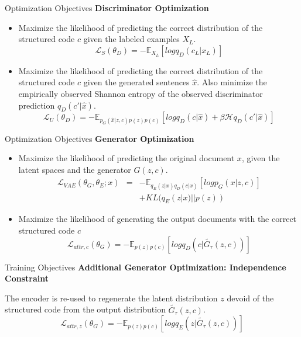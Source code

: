 \documentclass{beamer}
\begin{document}
  \begin{frame}{Optimization Objectives}
    \textbf{Discriminator Optimization} 

    \begin{itemize}
      \item Maximize the likelihood of predicting the correct distribution of the structured code $c$ given the labeled examples $X_L$.
      \begin{equation*}
        \mathcal{L}_S(\theta_D) = - \mathbb{E}_{X_L}[log q_D(c_L|x_L)]
      \end{equation*}
      \item Maximize the likelihood of predicting the correct distribution of the structured code $c$ given the generated sentences $\hat{x}$. Also minimize the empirically observed Shannon entropy of the observed discriminator prediction $q_D(c'|\hat{x})$.
      \begin{equation*}
        \mathcal{L}_U(\theta_D) = - \mathbb{E}_{p_G(\hat{x}|z,c)p(z)p(c)} 
        [log q_D(c|\hat{x}) + \beta \mathcal{H} q_D(c'|\hat{x})]
      \end{equation*}
    \end{itemize}
  \end{frame}

  \begin{frame}{Optimization Objectives}
    \textbf{Generator Optimization}

    \begin{itemize}
      \item Maximize the likelihood of predicting the original document $x$, given the latent spaces and the generator $G(z,c)$.
        \begin{eqnarray*}
          \mathcal{L}_{VAE}(\theta_G, \theta_E; x) &=& 
          - \mathbb{E}_{q_E(z|x)q_D(c|x)}[log p_G(x|z,c)] \\ & & 
          + KL(q_E(z|x)||p(z))
        \end{eqnarray*}
      \item Maximize the likelihood of generating the output documents with the correct structured code $c$
      \begin{equation*}
        \mathcal{L}_{attr, c}(\theta_G) = - \mathbb{E}_{p(z)p(c)} 
        [log q_D(c|\tilde{G_{\tau}}(z,c))]
      \end{equation*}
    \end{itemize}
  \end{frame}

  \begin{frame}{Training Objectives}
    \textbf{Additional Generator Optimization: Independence Constraint}
    
    The encoder is re-used to regenerate the latent distribution $z$ devoid of the structured code from the output distribution $\tilde{G_{\tau}}(z,c)$. 
    \begin{equation*}
      \mathcal{L}_{attr, z}(\theta_G) = - \mathbb{E}_{p(z)p(c)} 
      [log q_E(z|\tilde{G_{\tau}}(z,c))]
    \end{equation*}
  \end{frame}
\end{document}
